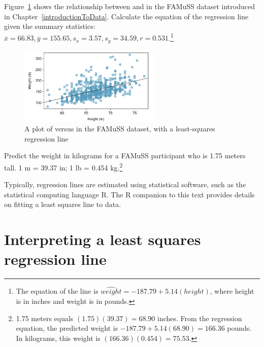 \begin{exercise}
Figure~\ref{famussHeightWeightRegress} shows the relationship between  and  in the FAMuSS dataset introduced in Chapter~\ref{introductionToData}. Calculate the equation of the regression line given the summary statistics: $\overline{x} = 66.83, \overline{y} = 155.65, s_{x} = 3.57, s_{y} = 34.59, r = 0.531$.\footnote{The equation of the line is $\widehat{weight} = -187.79 + 5.14(height)$, where height is in inches and weight is in pounds.}

\begin{figure}[h!] 
	\centering
	\includegraphics[width=0.6\textwidth]
	{ch_simple_linear_regression_oi_biostat/figures/famussHeightWeightRegress/famussHeightWeightRegress}
	\caption{A plot of  versus  in the FAMuSS dataset, with a least-squares regression line}
	\label{famussHeightWeightRegress}
\end{figure}

	
\end{exercise}

\begin{exercise} \label{predictingFamussWeightfrmHeightMetric}
Predict the weight in kilograms for a FAMuSS participant who is 1.75 meters tall. 1 m = 39.37 in; 1 lb = 0.454 kg.\footnote{1.75 meters equals $(1.75)(39.37) = 68.90$ inches. From the regression equation, the predicted weight is $-187.79 + 5.14(68.90) = 166.36$ pounds. In kilograms, this weight is $(166.36)(0.454) = 75.53$.}
\end{exercise}


Typically, regression lines are estimated using statistical software, such as the statistical computing language \textsf{R}. The \textsf{R} companion to this text provides details on fitting a least squares line to data. 


\section{Interpreting a least squares regression line}
\label{interpretingLeastSquaresLine}

